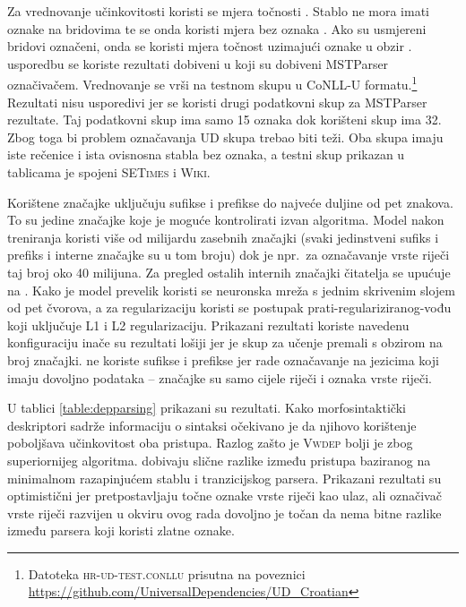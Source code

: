 Za vrednovanje učinkovitosti koristi se mjera točnosti . Stablo
ne mora imati oznake na bridovima te se onda koristi mjera bez oznaka
. Ako su usmjereni bridovi označeni, onda
se koristi mjera točnost uzimajući oznake u obzir . usporedbu se koriste rezultati dobiveni u \citep{agic2013three}
koji su dobiveni MSTParser označivačem. Vrednovanje se vrši na testnom skupu u
CoNLL-U formatu.\footnote{Datoteka \textsc{hr-ud-test.conllu} prisutna na
poveznici \url{https://github.com/UniversalDependencies/UD_Croatian}} Rezultati
nisu usporedivi jer se koristi drugi podatkovni skup za MSTParser rezultate. Taj
podatkovni skup ima samo 15 oznaka dok korišteni skup ima 32. Zbog toga bi
problem označavanja UD skupa trebao biti teži. Oba skupa imaju iste rečenice i
ista ovisnosna stabla bez oznaka, a testni skup prikazan u tablicama je spojeni
\textsc{SETimes} i \textsc{Wiki}.

Korištene značajke uključuju sufikse i prefikse do najveće duljine od pet
znakova. To su jedine značajke koje je moguće kontrolirati izvan algoritma.
Model nakon treniranja koristi više od milijardu zasebnih značajki (svaki
jedinstveni sufiks i prefiks i interne značajke su u tom broju) dok je npr.~za
označavanje vrste riječi taj broj oko 40 milijuna. Za pregled ostalih internih
značajki čitatelja se upućuje na \citep{chang2015learning}. Kako je model
prevelik koristi se neuronska mreža s jednim skrivenim slojem od pet čvorova, a
za regularizaciju koristi se postupak prati-regulariziranog-vođu  koji uključuje L1 i L2 regularizaciju. Prikazani
rezultati koriste navedenu konfiguraciju inače su rezultati lošiji jer je skup
za učenje premali s obzirom na broj značajki. \citet{chang2015learning} ne
koriste sufikse i prefikse jer rade označavanje na jezicima koji imaju dovoljno
podataka -- značajke su samo cijele riječi i oznaka vrste riječi.

U tablici \ref{table:depparsing} prikazani su rezultati. Kako morfosintaktički
deskriptori sadrže informaciju o sintaksi očekivano je da njihovo korištenje
poboljšava učinkovitost oba pristupa. Razlog zašto je \textsc{Vwdep} bolji je
zbog superiornijeg algoritma. \citet{cer2010parsing} dobivaju slične razlike
između pristupa baziranog na minimalnom razapinjućem stablu i tranzicijskog
parsera. Prikazani rezultati su optimistični jer pretpostavljaju točne oznake
vrste riječi kao ulaz, ali označivač vrste riječi razvijen u okviru ovog rada
dovoljno je točan da nema bitne razlike između parsera koji koristi zlatne
oznake.

